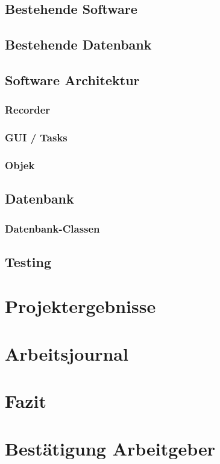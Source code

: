 \documentclass[10pt]{scrartcl}
\begin{document}
\subsection{Bestehende Software}
\subsection{Bestehende Datenbank}
\subsection{Software Architektur}
\subsubsection{Recorder}
\subsubsection{GUI / Tasks}
\subsubsection{Objek}
\subsection{Datenbank}
\subsubsection{Datenbank-Classen}
\subsection{Testing}
\section{Projektergebnisse}
\section{Arbeitsjournal}
\section{Fazit}
\section{Bestätigung Arbeitgeber}
\end{document}
